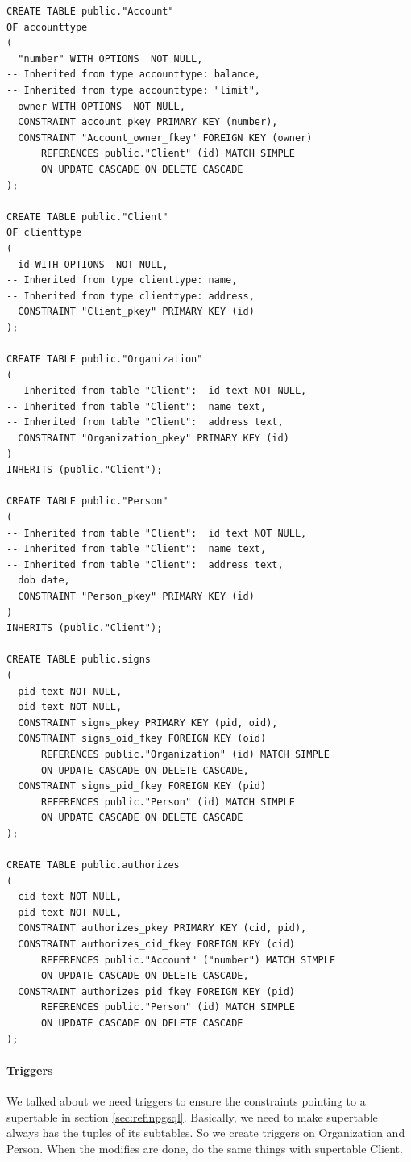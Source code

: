 \documentclass[11pt]{article}
\begin{document}
\begin{verbatim}
CREATE TABLE public."Account"
OF accounttype
(
  "number" WITH OPTIONS  NOT NULL,
-- Inherited from type accounttype: balance,
-- Inherited from type accounttype: "limit",
  owner WITH OPTIONS  NOT NULL,
  CONSTRAINT account_pkey PRIMARY KEY (number),
  CONSTRAINT "Account_owner_fkey" FOREIGN KEY (owner)
      REFERENCES public."Client" (id) MATCH SIMPLE
      ON UPDATE CASCADE ON DELETE CASCADE
);

CREATE TABLE public."Client"
OF clienttype
(
  id WITH OPTIONS  NOT NULL,
-- Inherited from type clienttype: name,
-- Inherited from type clienttype: address,
  CONSTRAINT "Client_pkey" PRIMARY KEY (id)
);

CREATE TABLE public."Organization"
(
-- Inherited from table "Client":  id text NOT NULL,
-- Inherited from table "Client":  name text,
-- Inherited from table "Client":  address text,
  CONSTRAINT "Organization_pkey" PRIMARY KEY (id)
)
INHERITS (public."Client");

CREATE TABLE public."Person"
(
-- Inherited from table "Client":  id text NOT NULL,
-- Inherited from table "Client":  name text,
-- Inherited from table "Client":  address text,
  dob date,
  CONSTRAINT "Person_pkey" PRIMARY KEY (id)
)
INHERITS (public."Client");

CREATE TABLE public.signs
(
  pid text NOT NULL,
  oid text NOT NULL,
  CONSTRAINT signs_pkey PRIMARY KEY (pid, oid),
  CONSTRAINT signs_oid_fkey FOREIGN KEY (oid)
      REFERENCES public."Organization" (id) MATCH SIMPLE
      ON UPDATE CASCADE ON DELETE CASCADE,
  CONSTRAINT signs_pid_fkey FOREIGN KEY (pid)
      REFERENCES public."Person" (id) MATCH SIMPLE
      ON UPDATE CASCADE ON DELETE CASCADE
);

CREATE TABLE public.authorizes
(
  cid text NOT NULL,
  pid text NOT NULL,
  CONSTRAINT authorizes_pkey PRIMARY KEY (cid, pid),
  CONSTRAINT authorizes_cid_fkey FOREIGN KEY (cid)
      REFERENCES public."Account" ("number") MATCH SIMPLE
      ON UPDATE CASCADE ON DELETE CASCADE,
  CONSTRAINT authorizes_pid_fkey FOREIGN KEY (pid)
      REFERENCES public."Person" (id) MATCH SIMPLE
      ON UPDATE CASCADE ON DELETE CASCADE
);
\end{verbatim}

\paragraph{Triggers}
\par
We talked about we need triggers to ensure the constraints pointing to a supertable in section \ref{sec:refinpgsql}. Basically, we need to make supertable always has the tuples of its subtables. So we create triggers on Organization and Person. When the modifies are done, do the same things with supertable Client.
\end{document}
